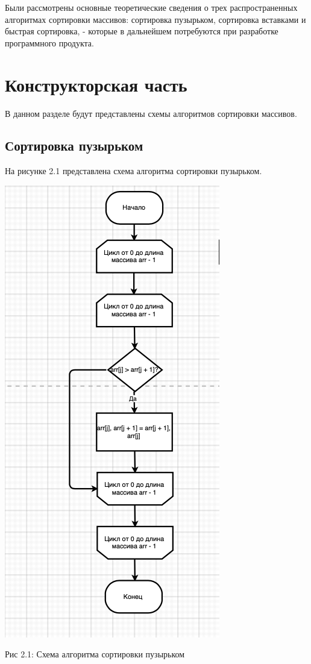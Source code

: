 \documentclass[12pt]{report}
\begin{document}
Были рассмотрены основные теоретические сведения о трех распространенных алгоритмах сортировки массивов: сортировка пузырьком, сортировка вставками и быстрая сортировка, - которые в дальнейшем потребуются при разработке программного продукта.  

\chapter{Конструкторская часть}

В данном разделе будут представлены схемы алгоритмов сортировки массивов.

\section{Сортировка пузырьком}


На рисунке 2.1 представлена схема алгоритма сортировки пузырьком.

\begin{center}
		\includegraphics[scale=0.8]{schema/BubbleSort.png}
		
			Рис 2.1: Схема алгоритма сортировки пузырьком
\end{center}
\end{document}
